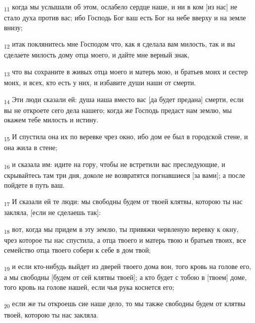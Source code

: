 \begin{tcolorbox}
\textsubscript{11} когда мы услышали об этом, ослабело сердце наше, и ни в ком [из нас] не стало духа против вас; ибо Господь Бог ваш есть Бог на небе вверху и на земле внизу;
\end{tcolorbox}
\begin{tcolorbox}
\textsubscript{12} итак поклянитесь мне Господом что, как я сделала вам милость, так и вы сделаете милость дому отца моего, и дайте мне верный знак,
\end{tcolorbox}
\begin{tcolorbox}
\textsubscript{13} что вы сохраните в живых отца моего и матерь мою, и братьев моих и сестер моих, и всех, кто есть у них, и избавите души наши от смерти.
\end{tcolorbox}
\begin{tcolorbox}
\textsubscript{14} Эти люди сказали ей: душа наша вместо вас [да будет предана] смерти, если вы не откроете сего дела нашего; когда же Господь предаст нам землю, мы окажем тебе милость и истину.
\end{tcolorbox}
\begin{tcolorbox}
\textsubscript{15} И спустила она их по веревке чрез окно, ибо дом ее был в городской стене, и она жила в стене;
\end{tcolorbox}
\begin{tcolorbox}
\textsubscript{16} и сказала им: идите на гору, чтобы не встретили вас преследующие, и скрывайтесь там три дня, доколе не возвратятся погнавшиеся [за вами]; а после пойдете в путь ваш.
\end{tcolorbox}
\begin{tcolorbox}
\textsubscript{17} И сказали ей те люди: мы свободны будем от твоей клятвы, которою ты нас закляла, [если не сделаешь так]:
\end{tcolorbox}
\begin{tcolorbox}
\textsubscript{18} вот, когда мы придем в эту землю, ты привяжи червленую веревку к окну, чрез которое ты нас спустила, а отца твоего и матерь твою и братьев твоих, все семейство отца твоего собери к себе в дом твой;
\end{tcolorbox}
\begin{tcolorbox}
\textsubscript{19} и если кто-нибудь выйдет из дверей твоего дома вон, того кровь на голове его, а мы свободны [будем от сей клятвы твоей]; а кто будет с тобою в [твоем] доме, того кровь на голове нашей, если чья рука коснется его;
\end{tcolorbox}
\begin{tcolorbox}
\textsubscript{20} если же ты откроешь сие наше дело, то мы также свободны будем от клятвы твоей, которою ты нас закляла.
\end{tcolorbox}
